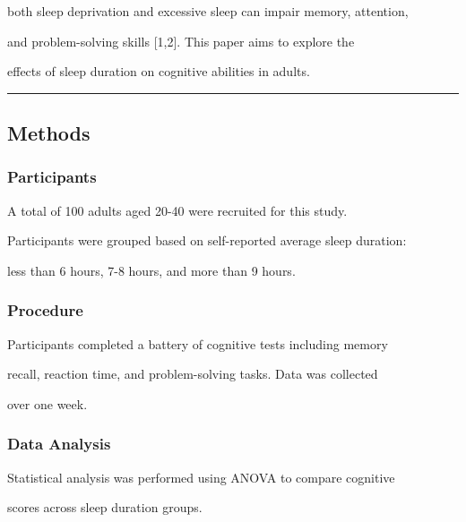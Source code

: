 \documentclass{article}
\begin{document}
both sleep deprivation and excessive sleep can impair memory, attention,

and problem-solving skills {[}1,2{]}. This paper aims to explore the

effects of sleep duration on cognitive abilities in adults.



\begin{center}\rule{0.5\linewidth}{0.5pt}\end{center}



\subsection{Methods}\label{methods}



\subsubsection{Participants}\label{participants}



A total of 100 adults aged 20-40 were recruited for this study.

Participants were grouped based on self-reported average sleep duration:

less than 6 hours, 7-8 hours, and more than 9 hours.



\subsubsection{Procedure}\label{procedure}



Participants completed a battery of cognitive tests including memory

recall, reaction time, and problem-solving tasks. Data was collected

over one week.



\subsubsection{Data Analysis}\label{data-analysis}



Statistical analysis was performed using ANOVA to compare cognitive

scores across sleep duration groups.
\end{document}
